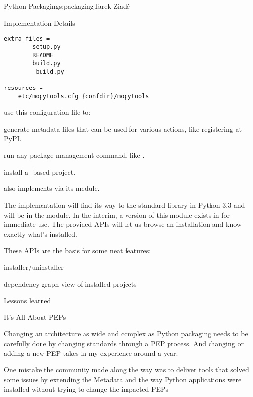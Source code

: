 \begin{aosachapter}{Python Packaging}{s:packaging}{Tarek Ziad\'{e}}
\begin{aosasect1}{Implementation Details}
\begin{verbatim}
extra_files =
        setup.py
        README
        build.py
        _build.py

resources =
    etc/mopytools.cfg {confdir}/mopytools
\end{verbatim}

\noindent {} use this configuration file to:

\begin{aosaitemize}

  \item generate  metadata files that can be used for various
  actions, like registering at PyPI.

  \item run any package management command, like .

  \item install a -based project.

\end{aosaitemize}

\noindent
{} also implements  via its 
module.

The  implementation will find its way to the standard library
in Python 3.3 and will be in the  module. In the
interim, a version of this module exists in  for
immediate use.  The provided APIs will let us browse an installation
and know exactly what's installed.

These APIs are the basis for some neat  features:

\begin{aosaitemize}
  \item installer/uninstaller
  \item dependency graph view of installed projects
\end{aosaitemize}

\end{aosasect1}

\begin{aosasect1}{Lessons learned}

\begin{aosasect2}{It's All About PEPs}

Changing an architecture as wide and complex as Python packaging 
needs to be carefully done by changing standards through a
PEP process. And changing or adding a new PEP takes in my
experience around a year.

One mistake the community made along the way was to deliver tools 
that solved some issues by extending the Metadata and the way Python 
applications were installed without trying to change the impacted 
PEPs.


\end{aosasect2}
\end{aosasect1}
\end{aosachapter}
